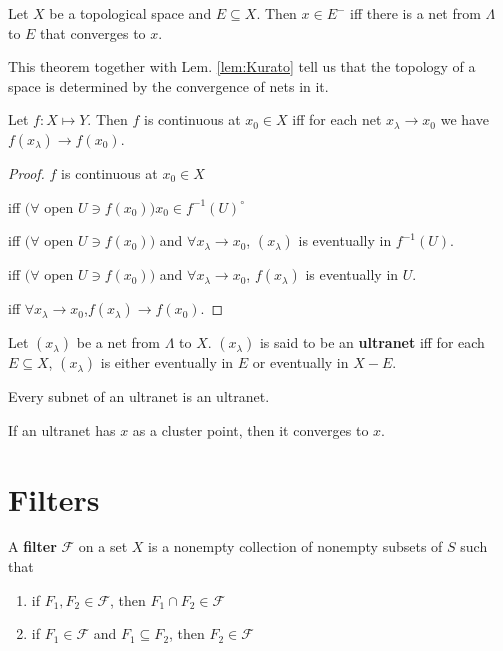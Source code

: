 \documentclass[12pt]{book}
\begin{document}
\begin{theorem}
	Let $X$ be a topological space and $E\subseteq X$. Then $x\in E^-$ iff there is a net from $\Lambda$ to $E$ that converges to $x$.
\end{theorem}

This theorem together with Lem. \ref{lem:Kurato} tell us that the topology of a space is determined by the convergence of nets in it.

\begin{theorem}
	Let $f:X\mapsto Y$. Then $f$ is continuous at $x_0\in X$ iff for each net $x_\lambda\rightarrow x_0$ we have $f(x_\lambda)\rightarrow f(x_0)$.
\end{theorem}
\begin{proof}
	$f$ is continuous at $x_0\in X$ 
	
	iff $(\forall $ open $U\ni f(x_0))x_0\in f^{-1}(U)^\circ$ 
	
	iff $(\forall $ open $U\ni f(x_0))$ and $\forall x_\lambda\rightarrow x_0$, $(x_\lambda)$ is eventually in $f^{-1}(U)$.
	
	iff $(\forall $ open $U\ni f(x_0))$ and $\forall x_\lambda\rightarrow x_0$, $f(x_\lambda)$ is eventually in $U$.
	
	iff $\forall x_\lambda\rightarrow x_0$,$f(x_\lambda)\rightarrow f(x_0)$.
\end{proof}

\begin{definition}
	Let $(x_\lambda)$ be a net from $\Lambda$ to $X$. $(x_\lambda)$ is said to be an {\bf ultranet} iff for each $E\subseteq X$, $(x_\lambda)$ is either eventually in $E$ or eventually in $X-E$.
\end{definition}

\begin{theorem}
	Every subnet of an ultranet is an ultranet.
\end{theorem}

\begin{theorem}
	If an ultranet has $x$ as a cluster point, then it converges to $x$.
\end{theorem}

\section{Filters}

\begin{definition}
	A {\bf filter} $\mathcal F$ on a set $X$ is a nonempty collection of nonempty subsets of $S$ such that 
	\begin{enumerate}
		\item if $F_1,F_2\in \mathcal F$, then $F_1\cap F_2\in \mathcal F$
		\item if $F_1\in \mathcal F$ and $F_1\subseteq F_2$, then $F_2\in \mathcal F$
	\end{enumerate}
\end{definition}
\end{document}
